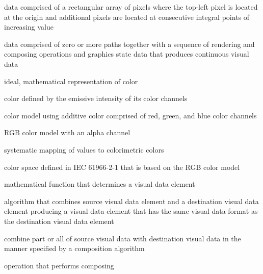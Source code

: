 %
data comprised of a rectangular array of pixels where the top-left pixel is located at the origin and additional pixels are located at consecutive integral points of increasing value

%
data comprised of zero or more paths together with a sequence of rendering and composing operations and graphics state data that produces continuous visual data

%
ideal, mathematical representation of color

%
color defined by the emissive intensity of its color channels

%
%
color model using additive color comprised of red, green, and blue color channels

%
%
RGB color model with an alpha channel

%
systematic mapping of values to colorimetric colors

%
%
color space defined in IEC 61966-2-1 that is based on the RGB color model

%
mathematical function that determines a visual data element

%
algorithm that combines source visual data element and a destination visual data element producing a visual data element that has the same visual data format as the destination visual data element

%
combine part or all of source visual data with destination visual data in the manner specified by a composition algorithm

%
operation that performs composing


